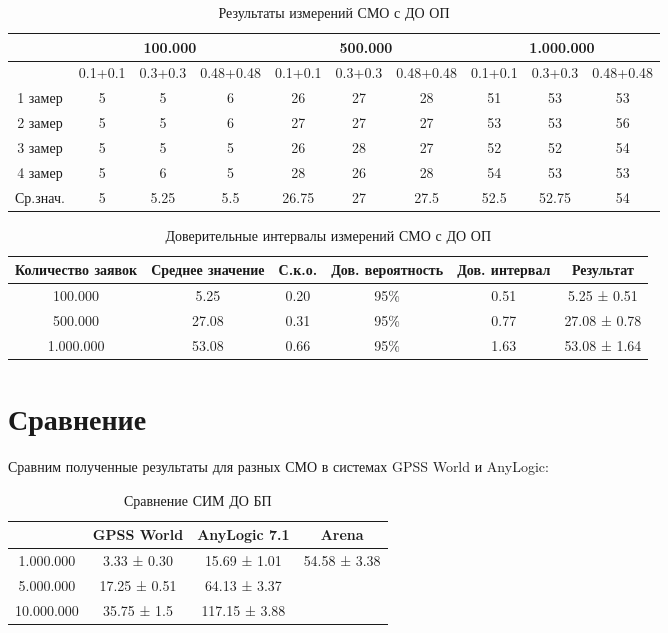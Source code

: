 \documentclass[a4paper,14pt]{report} %
\begin{document}
\begin{table}[h!]
\caption{Результаты измерений СМО с ДО ОП}
\begin{tabular}{|c|c|c|c|c|c|c|c|c|c|}
\hline
 & \multicolumn{3}{|c|}{100.000} & \multicolumn{3}{|c|}{500.000} & \multicolumn{3}{|c|}{1.000.000} \\
\hline
 & 0.1+0.1 & 0.3+0.3 & 0.48+0.48 & 0.1+0.1 & 0.3+0.3 & 0.48+0.48 & 0.1+0.1 & 0.3+0.3 & 0.48+0.48 \\
\hline
1 замер &  5 & 5 & 6 & 26 & 27 & 28 & 51 & 53 & 53    \\
\hline
2 замер &  5 & 5 & 6 & 27 & 27 & 27 & 53 & 53 & 56 \\
\hline
3 замер &   5 & 5 & 5 & 26 & 28 & 27 & 52 & 52 & 54  \\
\hline
4 замер &  5 & 6 & 5 & 28 & 26 & 28 & 54 & 53 & 53 \\
\hline
Ср.знач. &  5 & 5.25 & 5.5 & 26.75 & 27 & 27.5 & 52.5 & 52.75 & 54  \\
\hline
\end{tabular}
\end{table} 

\begin{table}[h!]
\caption{Доверительные интервалы измерений СМО с ДО ОП}
\begin{tabular}{|c|c|c|c|c|c|}
\hline
 Количество заявок & Среднее значение & С.к.о. & Дов. вероятность & Дов. интервал & Результат\\
\hline
100.000 & 5.25 & 0.20 & 95\% & 0.51 & 5.25 ± 0.51 \\
\hline
500.000 & 27.08 & 0.31 & 95\% & 0.77 & 27.08 ± 0.78 \\
\hline
1.000.000 & 53.08  & 0.66 & 95\% & 1.63 & 53.08 ± 1.64 \\
\hline
\end{tabular}
\end{table} 
\section{Сравнение}
Сравним полученные результаты для разных СМО в системах GPSS World и AnyLogic: 

\begin{table}[h!]
\caption{Сравнение СИМ ДО БП}
\begin{tabular}{|c|c|c|c|}
\hline
 & GPSS World & AnyLogic 7.1  &  Arena\\
\hline
1.000.000 & 3.33 ± 0.30 & 15.69 ± 1.01 & 54.58 ± 3.38\\
\hline
5.000.000 & 17.25 ± 0.51 & 64.13 ± 3.37 & \\
\hline
10.000.000 & 35.75 ± 1.5 & 117.15 ± 3.88 &  \\
\hline
\end{tabular}
\end{table} 
\end{document}

